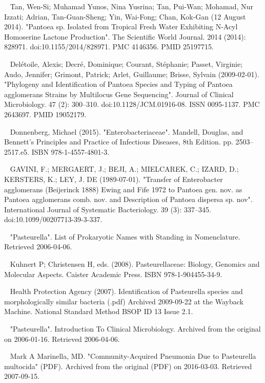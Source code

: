 \documentclass[11pt]{article}
\begin{document}
\begin{thebibliography}{3}
	~ Tan, Wen-Si; Muhamad Yunos, Nina Yusrina; Tan, Pui-Wan; Mohamad, Nur Izzati; Adrian, Tan-Guan-Sheng; Yin, Wai-Fong; Chan, Kok-Gan (12 August 2014). "Pantoea sp. Isolated from Tropical Fresh Water Exhibiting N-Acyl Homoserine Lactone Production". The Scientific World Journal. 2014 (2014): 828971. doi:10.1155/2014/828971. PMC 4146356. PMID 25197715.
	
	~ Delétoile, Alexis; Decré, Dominique; Courant, Stéphanie; Passet, Virginie; Audo, Jennifer; Grimont, Patrick; Arlet, Guillaume; Brisse, Sylvain (2009-02-01). "Phylogeny and Identification of Pantoea Species and Typing of Pantoea agglomerans Strains by Multilocus Gene Sequencing". Journal of Clinical Microbiology. 47 (2): 300–310. doi:10.1128/JCM.01916-08. ISSN 0095-1137. PMC 2643697. PMID 19052179.
	
	~ Donnenberg, Michael (2015). "Enterobacteriaceae". Mandell, Douglas, and Bennett's Principles and Practice of Infectious Diseases, 8th Edition. pp. 2503–2517.e5. ISBN 978-1-4557-4801-3.

	~ GAVINI, F.; MERGAERT, J.; BEJI, A.; MIELCAREK, C.; IZARD, D.; KERSTERS, K.; LEY, J. DE (1989-07-01). "Transfer of Enterobacter agglomerans (Beijerinck 1888) Ewing and Fife 1972 to Pantoea gen. nov. as Pantoea agglomerans comb. nov. and Description of Pantoea dispersa sp. nov". International Journal of Systematic Bacteriology. 39 (3): 337–345. doi:10.1099/00207713-39-3-337.
	
	~ "Pasteurella". List of Prokaryotic Names with Standing in Nomenclature. Retrieved 2006-04-06.
	
	~ Kuhnert P; Christensen H, eds. (2008). Pasteurellaceae: Biology, Genomics and Molecular Aspects. Caister Academic Press. ISBN 978-1-904455-34-9.
	
	~ Health Protection Agency (2007). Identification of Pasteurella species and morphologically similar bacteria (.pdf) Archived 2009-09-22 at the Wayback Machine. National Standard Method BSOP ID 13 Issue 2.1.

	~ "Pasteurella". Introduction To Clinical Microbiology. Archived from the original on 2006-01-16. Retrieved 2006-04-06.
	
	~ Mark A Marinella, MD. "Community-Acquired Pneumonia Due to Pasteurella multocida" (PDF). Archived from the original (PDF) on 2016-03-03. Retrieved 2007-09-15.
	

\end{thebibliography}
\end{document}
